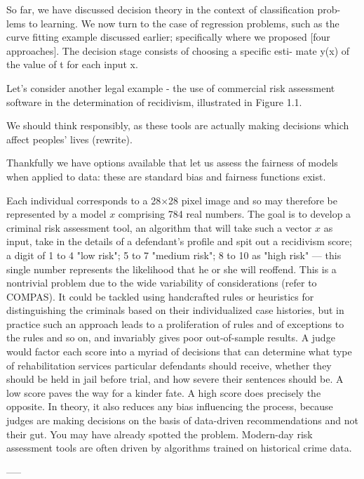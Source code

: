 \documentclass[7pt]{article}
\begin{document}
 
 So far, we have discussed decision theory in the context of classification prob- lems to learning. We now turn to the case of regression problems, such as the curve fitting example discussed earlier; specifically where we proposed [four approaches]. The decision stage consists of choosing a specific esti- mate y(x) of the value of t for each input x. 


Let's consider another legal example - the use of commercial risk assessment software in the determination of recidivism, illustrated in Figure 1.1. 

We should think responsibly,  as these tools are actually making decisions which affect peoples’ lives (rewrite).

Thankfully we have options available that let us assess the fairness of models when applied to data: these are standard bias and fairness functions exist.


Each individual corresponds to a 28×28 pixel image and so may therefore be represented by a model $x$ comprising 784 real numbers. The goal is to develop a criminal risk assessment tool, an algorithm that will take such a vector $x$ as input, take in the details of a defendant’s profile and spit out a recidivism score; a digit of 1 to 4 "low risk"; 5 to 7 "medium risk"; 8 to 10 as "high risk" — this single number represents the likelihood that he or she will reoffend. This is a nontrivial problem due to the wide variability of considerations (refer to COMPAS). It could be tackled using handcrafted rules or heuristics for distinguishing the criminals based on their individualized case histories, but in practice such an approach leads to a proliferation of rules and of exceptions to the rules and so on, and invariably gives poor out-of-sample results. A judge would factor each score into a myriad of decisions that can determine what type of rehabilitation services particular defendants should receive, whether they should be held in jail before trial, and how severe their sentences should be. A low score paves the way for a kinder fate. A high score does precisely the opposite. In theory, it also reduces any bias influencing the process, because judges are making decisions on the basis of data-driven recommendations and not their gut. You may have already spotted the problem. Modern-day risk assessment tools are often driven by algorithms trained on historical crime data.

-----
\end{document}
